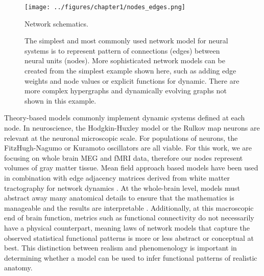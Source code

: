 \begin{figure}[htbp]
	\centering
	\texttt{[image: ../figures/chapter1/nodes\_edges.png]}
	\caption{Network schematics.}
	\caption*{The simplest and most commonly used network model for neural systems is to represent pattern of connections (edges) between neural units (nodes). More sophisticated network models can be created from the simplest example shown here, such as adding edge weights and node values or explicit functions for dynamic. There are more complex hypergraphs and dynamically evolving graphs not shown in this example.}
	\label{fig:nodes-edges}
\end{figure}

Theory-based models commonly implement dynamic systems defined at each node. In neuroscience, the Hodgkin-Huxley model \cite{hodgkin_quantitative_1952} or the Rulkov map neurons \cite{zhu_effects_2016} are relevant at the neuronal microscopic scale. For populations of neurons, the FitzHugh-Nagumo \cite{acebron_noisy_2004} or Kuramoto oscillators \cite{breakspear_generative_2010} are all viable. For this work, we are focusing on whole brain MEG and fMRI data, therefore our nodes represent volumes of gray matter tissue. Mean field approach based models have been used in combination with edge adjacency matrices derived from white matter tractography for network dynamics \cite{breakspear_dynamic_2017}. At the whole-brain level, models must abstract away many anatomical details to ensure that the mathematics is manageable and the results are interpretable \cite{gerstner_theory_2012}. Additionally, at this macroscopic end of brain function, metrics such as functional connectivity do not necessarily have a physical counterpart, meaning laws of network models that capture the observed statistical functional patterns is more or less abstract or conceptual at best. This distinction between realism and phenomenology is important in determining whether a model can be used to infer functional patterns of realistic anatomy. 

